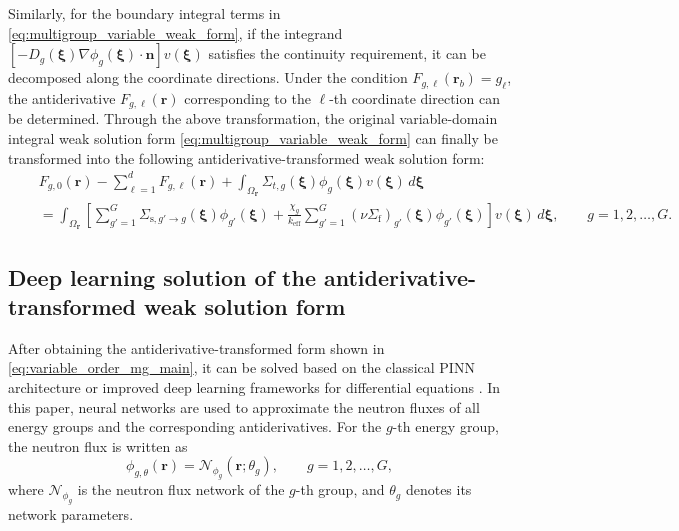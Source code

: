 \documentclass[final,3p,times,sort&compress]{elsarticle}
\begin{document}
Similarly, for the boundary integral terms in \cref{eq:multigroup_variable_weak_form}, if the integrand $\left[ -D_g(\boldsymbol \xi) \nabla \phi_g(\boldsymbol \xi) \cdot \boldsymbol n \right] v(\boldsymbol \xi)$ satisfies the continuity requirement, it can be decomposed along the coordinate directions. Under the condition $F_{g,\ell}(\boldsymbol r_b) = {g}_{\ell}$, the antiderivative $F_{g,\ell}(\boldsymbol r)$ corresponding to the $\ell$-th coordinate direction can be determined. Through the above transformation, the original variable-domain integral weak solution form \cref{eq:multigroup_variable_weak_form} can finally be transformed into the following antiderivative-transformed weak solution form:
\begin{equation}
    \begin{aligned}
    & F_{g,0}(\boldsymbol r) - \sum_{\ell=1}^{d}F_{g,\ell}(\boldsymbol r) + \int_{\Omega_{\boldsymbol r}} \Sigma_{t,g}(\boldsymbol \xi) \phi_g(\boldsymbol \xi) v(\boldsymbol \xi) \,d\boldsymbol \xi \\
    \quad & =
    \int_{\Omega_{\boldsymbol r}}
    \left[
    \sum_{g'=1}^{G}
    \Sigma_{\mathrm{s},g'\to g}(\boldsymbol \xi)
    \phi_{g'}(\boldsymbol \xi)
    +
    \frac{\chi_g}{k_{\mathrm{eff}}}
    \sum_{g'=1}^{G}
    \left(\nu\Sigma_{\mathrm{f}}\right)_{g'}(\boldsymbol \xi)
    \phi_{g'}(\boldsymbol \xi)
    \right]
    v(\boldsymbol \xi)\,d\boldsymbol \xi ,
    \qquad g=1,2,\ldots,G .
    \end{aligned}
    \label{eq:variable_order_mg_main}
\end{equation}

\subsection{Deep learning solution of the antiderivative-transformed weak solution form}
\label{sec:nn_loss}

After obtaining the antiderivative-transformed form shown in \cref{eq:variable_order_mg_main}, it can be solved based on the classical PINN architecture \cite{raissi2019physicsinformed} or improved deep learning frameworks for differential equations \cite{sengupta2020review, wang2024multistage}. In this paper, neural networks are used to approximate the neutron fluxes of all energy groups and the corresponding antiderivatives. For the $g$-th energy group, the neutron flux is written as
\begin{equation}
\phi_{g,\theta}(\boldsymbol r)
=
\mathcal{N}_{\phi_g}(\boldsymbol r;\theta_g),
\qquad g=1,2,\ldots,G ,
\label{eq:nn_phi_g}
\end{equation}
where $\mathcal{N}_{\phi_g}$ is the neutron flux network of the $g$-th group, and $\theta_g$ denotes its network parameters.
\end{document}
